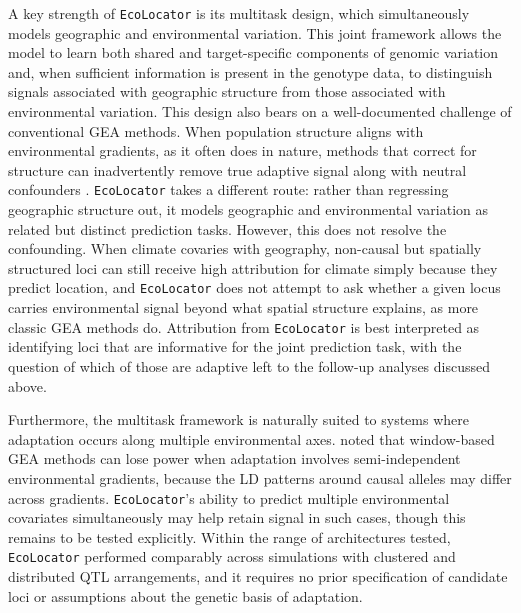 \documentclass[]{article}
\newcommand{\ecolocator}{\texttt{EcoLocator}\xspace}
\begin{document}
A key strength of \ecolocator is its multitask design, 
which simultaneously models geographic and environmental variation. 
This joint framework allows the model to learn both shared and target-specific 
components of genomic variation and, when sufficient information is present in the 
genotype data, to distinguish signals associated with geographic structure from those 
associated with environmental variation. This design also bears on a well-documented
challenge of conventional GEA methods. When population structure aligns with
environmental gradients, as it often does in nature, methods that correct for
structure can inadvertently remove true adaptive signal along with neutral
confounders \citep{lotterhos_recombination_2019, booker_wza_2024}.
\ecolocator takes a different route: rather than regressing geographic structure
out, it models geographic and environmental variation as related but distinct
prediction tasks. However, this does not resolve the confounding. When climate
covaries with geography, non-causal but spatially structured loci can still
receive high attribution for climate simply because they predict location, and
\ecolocator does not attempt to ask whether a given locus carries environmental
signal beyond what spatial structure explains, as more classic GEA methods do.
Attribution from \ecolocator is best interpreted as identifying loci that are
informative for the joint prediction task, with the question of which of those
are adaptive left to the follow-up analyses discussed above.

Furthermore, the multitask framework
is naturally suited to systems
where adaptation occurs along multiple environmental axes.
\citet{booker_wza_2024} noted that window-based GEA methods
can lose power when adaptation involves
semi-independent environmental gradients,
because the LD patterns around causal alleles
may differ across gradients.
\ecolocator's ability to predict multiple environmental covariates
simultaneously may help retain signal in such cases,
though this remains to be tested explicitly.
Within the range of architectures tested,
\ecolocator performed comparably across simulations
with clustered and distributed QTL arrangements,
and it requires no prior specification of candidate loci
or assumptions about the genetic basis of adaptation.
\end{document}
